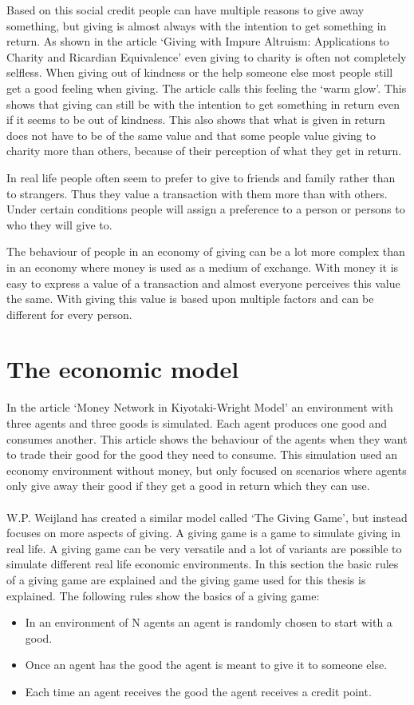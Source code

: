 \documentclass[twoside,openright]{uva-bachelor-thesis}
\begin{document}
Based on this social credit people can have multiple reasons to give away something, but giving is almost always with the intention to get something in return. As shown in the article ‘Giving with Impure Altruism: Applications to Charity and Ricardian Equivalence’ even giving to charity is often not completely selfless. When giving out of kindness or the help someone else most people still get a good feeling when giving. The article calls this feeling the ‘warm glow’. This shows that giving can still be with the intention to get something in return even if it seems to be out of kindness. This also shows that what is given in return does not have to be of the same value and that some people value giving to charity more than others, because of their perception of what they get in return.

In real life people often seem to prefer to give to friends and family rather than to strangers. Thus they value a transaction with them more than with others. Under certain conditions people will assign a preference to a person or persons to who they will give to.

The behaviour of people in an economy of giving can be a lot more complex than in an economy where money is used as a medium of exchange. With money it is easy to express a value of a transaction and almost everyone perceives this value the same. With giving this value is based upon multiple factors and can be different for every person.



\section{The economic model}
In the article ‘Money Network in Kiyotaki-Wright Model’ an environment with three agents and three goods is simulated. Each agent produces one good and consumes another. This article shows the behaviour of the agents when they want to trade their good for the good they need to consume. This simulation used an economy environment without money, but only focused on scenarios where agents only give away their good if they get a good in return which they can use. 
\\
\\
W.P. Weijland has created a similar model called ‘The Giving Game’, but instead focuses on more aspects of giving. A giving game is a game to simulate giving in real life. A giving game can be very versatile and a lot of variants are possible to simulate different real life economic environments. In this section the basic rules of a giving game are explained and the giving game used for this thesis is explained.
The following rules show the basics of a giving game:
\begin{itemize}
  \item In an environment of N agents an agent is randomly chosen to start with a good.
  \item Once an agent has the good the agent is meant to give it to someone else.
  \item Each time an agent receives the good the agent receives a credit point.
\end{itemize}
\end{document}
